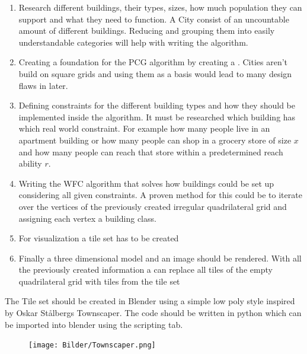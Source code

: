 \begin{enumerate}
    \item Research different buildings, their types, sizes, how much population they can support and what they need to function. A City consist of an uncountable amount of different buildings. Reducing and grouping them into easily understandable categories will help with writing the algorithm.
    \item Creating a foundation for the PCG algorithm by creating a . Cities aren't build on square grids and using them as a basis would lead to many design flaws in later.
    \item Defining constraints for the different building types and how they should be implemented inside the algorithm. It must be researched which building has which real world constraint. For example how many people live in an apartment building or how many people can shop in a grocery store of size \(x\) and how many people can reach that store within a predetermined reach ability \(r\).  
    \item Writing the WFC algorithm that solves how buildings could be set up considering all given constraints. A proven method for this could be to iterate over the vertices of the previously created irregular quadrilateral grid and assigning each vertex a building class.
    \item For visualization a tile set has to be created 
    \item Finally a three dimensional model and an image should be rendered. With all the previously created information a  can replace all tiles of the empty quadrilateral grid with tiles from the tile set
\end{enumerate}
The Tile set should be created in Blender using a simple low poly style inspired by Oskar Stålbergs Townscaper.
The code should be written in python which can be imported into blender using the scripting tab.

\begin{figure} [ht]
  \centering
  \texttt{[image: Bilder/Townscaper.png]}
    \caption{}
  \label{fig:gliederung}
\end{figure}

